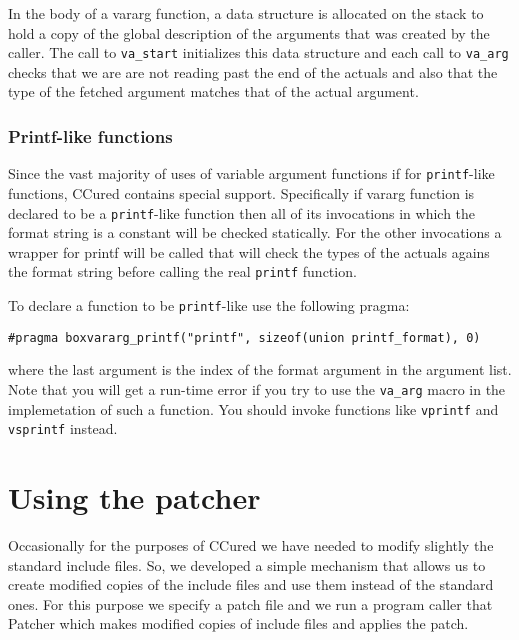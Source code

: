 \documentclass{book}
\def\t#1{{\tt #1}}
\begin{document}
 In the body of a vararg function, a data structure is allocated on the stack
to hold a copy of the global description of the arguments that was created by
the caller. The call to \t{va\_start} initializes this data structure and each
call to \t{va\_arg} checks that we are are not reading past the end of the
actuals and also that the type of the fetched argument matches that of the
actual argument. 

      \subsection{Printf-like functions}

 Since the vast majority of uses of variable argument functions if for
\t{printf}-like functions, CCured contains special support. Specifically if
vararg function is declared to be a \t{printf}-like function then all of its
invocations in which the format string is a constant will be checked
statically. For the other invocations a wrapper for printf will be called that
will check the types of the actuals agains the format string before calling
the real \t{printf} function. 

 To declare a function to be \t{printf}-like use the following pragma:
\begin{verbatim}
#pragma boxvararg_printf("printf", sizeof(union printf_format), 0)
\end{verbatim}

 where the last argument is the index of the format argument in the argument
list. Note that you will get a run-time error if you try to use the
\t{va\_arg} macro in the implemetation of such a function. You should invoke
functions like \t{vprintf} and \t{vsprintf} instead. 

    \chapter{Using the patcher}

 Occasionally for the purposes of CCured we have needed to modify slightly the
standard include files. So, we developed a simple mechanism that allows us to
create modified copies of the include files and use them instead of the
standard ones. For this purpose we specify a patch file and we run a program
caller that Patcher which makes modified copies of include files and applies
the patch. 
\end{document}
